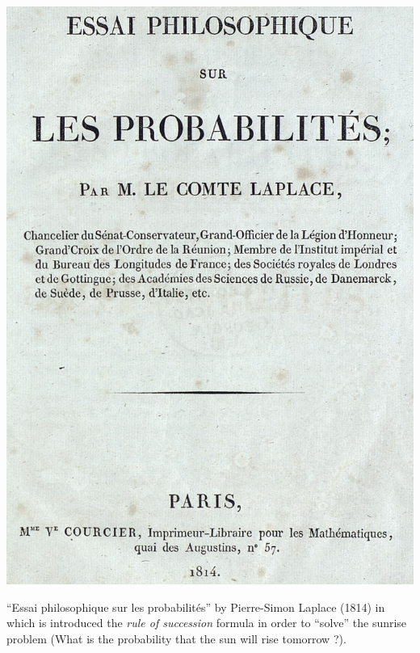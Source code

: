 \documentclass[
	fontsize=11pt, %
	twoside=false, %
	numbers=noenddot, %
]{kaobook}
\begin{document}
\begin{marginfigure}[*2]
	\includegraphics{images/laplace.png}
	\caption{``Essai philosophique sur les probabilités'' by Pierre-Simon Laplace (1814) in which is introduced the \emph{rule of succession} formula in order to ``solve'' the sunrise problem (What is the probability that the sun will rise tomorrow ?).}
	\label{fig:rule-of-succession}
\end{marginfigure}
\end{document}
